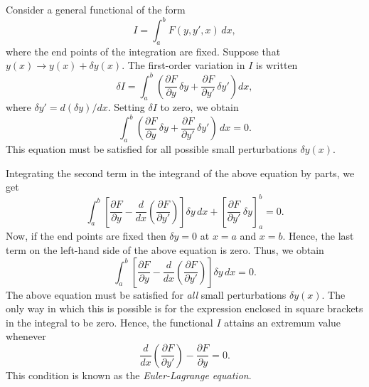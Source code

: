 Consider a general functional of the form
\begin{equation}\label{e11.3}
I = \int_a^b F(y, y',x)\,dx,
\end{equation}
where the end points of the integration are fixed.
   Suppose that $y(x)\rightarrow
y(x)+\delta y(x)$. The first-order variation in $I$ is written
\begin{equation}
\delta I = \int_a^b\left(\frac{\partial F}{\partial y}\,\delta y+ \frac{\partial F}{\partial y'}\,\delta y'\right)dx,
\end{equation}
where $\delta y' = d(\delta y)/dx$.  Setting $\delta I$ to zero, we
obtain
\begin{equation}
\int_a^b\left(\frac{\partial F}{\partial y}\,\delta y+ \frac{\partial F}{\partial y'}\,\delta y'\right)\,dx = 0.
\end{equation}
This equation must be satisfied for all possible small perturbations $\delta y(x)$. 

Integrating the second term in the integrand of the above equation by
parts, we get
\begin{equation}
\int_a^b\left[\frac{\partial F}{\partial y}- \frac{d}{dx}\!\left(\frac{\partial F}{\partial y'}\right)\right]\delta y\,dx +\left[\frac{\partial F}{\partial y'}\,\delta y\right]_a^b=0.
\end{equation}
Now, if the end points  are fixed then $\delta y=0$ at
$x=a$ and $x=b$. Hence, the last term on the left-hand side of the
above equation is zero. Thus, we obtain
\begin{equation}
\int_a^b\left[\frac{\partial F}{\partial y}- \frac{d}{dx}\!\left(\frac{\partial F}{\partial y'}\right)\right]\delta y\,dx =0.
\end{equation}
The above equation must be satisfied for {\em all}\/ small  perturbations
$\delta y(x)$. The only way in which this is possible is for the
expression enclosed in square brackets in the integral to be zero. Hence, the functional
$I$ attains an extremum value whenever
\begin{equation}\label{e11.8}
\frac{d}{dx}\!\left(\frac{\partial F}{\partial y'}\right)-\frac{\partial F}{\partial y} = 0.
\end{equation}
This condition is known as the {\em Euler-Lagrange equation}.

